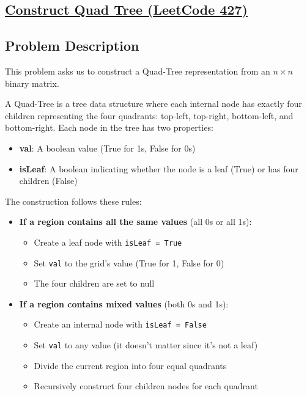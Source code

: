\subsection {\href{https://leetcode.com/problems/construct-quad-tree/}{Construct Quad Tree (LeetCode 427)}}

\subsection*{Problem Description}

This problem asks us to construct a Quad-Tree representation from an $n \times n$ binary matrix.

A Quad-Tree is a tree data structure where each internal node has exactly four children representing the four quadrants: top-left, top-right, bottom-left, and bottom-right. Each node in the tree has two properties:

\begin{itemize}
\item \textbf{val}: A boolean value (True for 1s, False for 0s)
\item \textbf{isLeaf}: A boolean indicating whether the node is a leaf (True) or has four children (False)
\end{itemize}

The construction follows these rules:

\begin{itemize}

\item \textbf{If a region contains all the same values} (all 0s or all 1s):

\begin{itemize}
\item Create a leaf node with \texttt{isLeaf = True}
\item Set \texttt{val} to the grid's value (True for 1, False for 0)
\item The four children are set to null
\end{itemize}

\item \textbf{If a region contains mixed values} (both 0s and 1s):

\begin{itemize}
\item Create an internal node with \texttt{isLeaf = False}
\item Set \texttt{val} to any value (it doesn't matter since it's not a leaf)
\item Divide the current region into four equal quadrants
\item Recursively construct four children nodes for each quadrant
\end{itemize}

\end{itemize}

